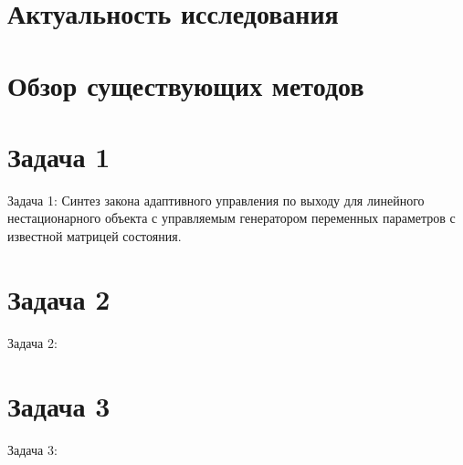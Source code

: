 \documentclass[10pt,aspectratio=169]{beamer}
\begin{document}
	\insertpagetitle
	\insertoutline
	\section{Актуальность исследования}
	
	
	\section{Обзор существующих методов}
	
	
	\section{Задача 1}
	\begin{frame} \hypertarget{slide\insertframenumber}{}
	\centering
	\LARGE Задача 1: Синтез закона адаптивного управления по выходу для линейного нестационарного объекта с управляемым генератором переменных параметров с известной матрицей состояния.
	\end{frame}
	
	\section{Задача 2}
	\begin{frame} \hypertarget{slide\insertframenumber}{}
	\centering
	\LARGE Задача 2: 
	\end{frame}
	
	\section{Задача 3}
	\begin{frame} \hypertarget{slide\insertframenumber}{}
		\centering
		\LARGE Задача 3: 
	\end{frame}
	
	
\end{document}
